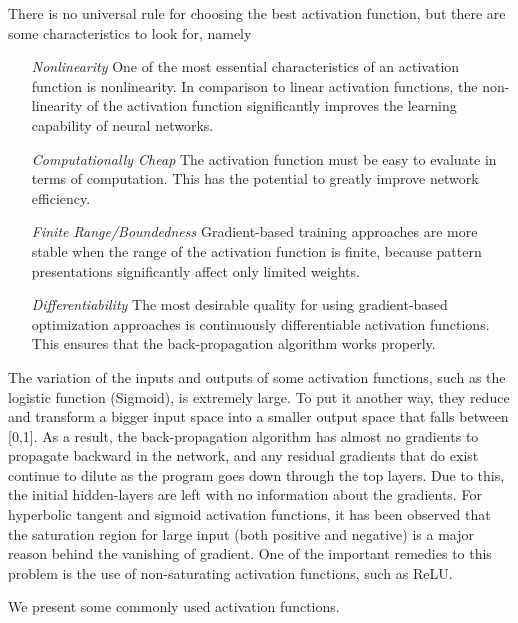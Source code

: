\documentclass[nobib]{tufte-handout} %
\begin{document}
\noindent There is no universal rule for choosing the best activation function, but there are some characteristics to look for, namely
\begin{enumerate}
  \item[\it Nonlinearity] One of the most essential characteristics
of an activation function is nonlinearity. In comparison
to linear activation functions, the non-linearity of the
activation function significantly improves the learning
capability of neural networks. 
\item[\it Computationally Cheap] The activation function must
be easy to evaluate in terms of computation. This has
the potential to greatly improve network efficiency.
\item[\it Finite Range/Boundedness] Gradient-based training approaches are more stable when the range of the activation function is finite, because pattern presentations
significantly affect only limited weights. 
\item[\it Differentiability] The most desirable quality for using
gradient-based optimization approaches is continuously
differentiable activation functions. This ensures that the
back-propagation algorithm works properly. 
\end{enumerate}
\begin{remark} The variation
of the inputs and outputs of some activation functions,
such as the logistic function (Sigmoid), is extremely
large. To put it another way, they reduce and transform
a bigger input space into a smaller output space that
falls between [0,1]. As a result, the back-propagation
algorithm has almost no gradients to propagate backward
in the network, and any residual gradients that do exist
continue to dilute as the program goes down through the
top layers. Due to this, the initial hidden-layers are left
with no information about the gradients. For hyperbolic
tangent and sigmoid activation functions, it has been
observed that the saturation region for large input (both
positive and negative) is a major reason behind the
vanishing of gradient. One of the important remedies
to this problem is the use of non-saturating activation
functions, such as ReLU.
\end{remark}
We present some commonly used activation functions.
\end{document}
